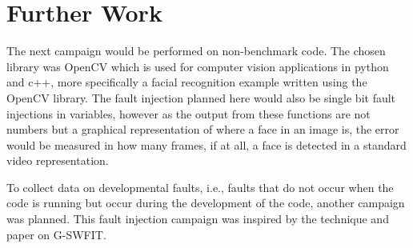 \section{Further Work}

The next campaign would be performed on non-benchmark code. The chosen library was OpenCV which is used for computer vision applications in python and c++, more specifically a facial recognition example written using the OpenCV library. The fault injection planned here would also be single bit fault injections in variables, however as the output from these functions are not numbers but a graphical representation of where a face in an image is, the error would be measured in how many frames, if at all, a face is detected in a standard video representation.

To collect data on developmental faults, i.e., faults that do not occur when the code is running but occur during the development of the code, another campaign was planned. This fault injection campaign was inspired by the technique and paper on G-SWFIT.

